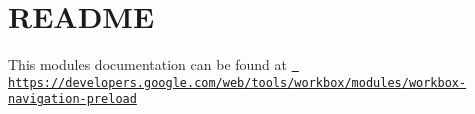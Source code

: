 \chapter{README}
\hypertarget{md_node__modules_2workbox-navigation-preload_2README}{}\label{md_node__modules_2workbox-navigation-preload_2README}
This module\textquotesingle{}s documentation can be found at \href{https://developers.google.com/web/tools/workbox/modules/workbox-navigation-preload}{\texttt{ https\+://developers.\+google.\+com/web/tools/workbox/modules/workbox-\/navigation-\/preload}} 